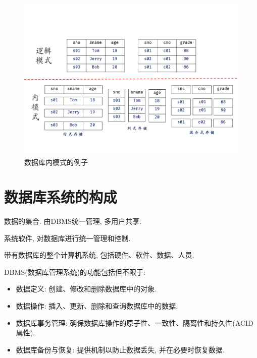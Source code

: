 \begin{figure}[H]
    \centering
    \includegraphics[width=.8\textwidth]{figure/内模式.pdf}
    \caption{数据库内模式的例子}
\end{figure}

\section{数据库系统的构成}

\begin{definition}[数据库]
    数据的集合. 由DBMS统一管理, 多用户共享.
\end{definition}

\begin{definition}[数据库管理系统DBMS]
    系统软件, 对数据库进行统一管理和控制.
\end{definition}

\begin{definition}[数据库系统]
    带有数据库的整个计算机系统, 包括硬件、软件、数据、人员.
\end{definition}

DBMS(数据库管理系统)的功能包括但不限于:
\begin{itemize}
    \item 数据定义: 创建、修改和删除数据库中的对象.
    \item 数据操作: 插入、更新、删除和查询数据库中的数据.
    \item 数据库事务管理: 确保数据库操作的原子性、一致性、隔离性和持久性(ACID属性).
    \item 数据库备份与恢复: 提供机制以防止数据丢失, 并在必要时恢复数据.
\end{itemize}

